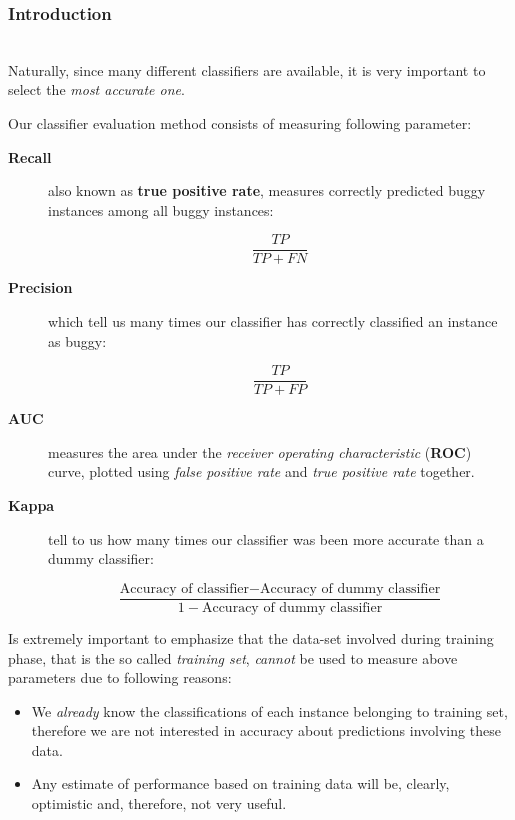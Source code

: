 \documentclass[sigconf]{acmart}
\begin{document}
\subsubsection{Introduction}
\hfill\\
Naturally, since many different classifiers are available, it is very important to select the \textit{most accurate one}. 

Our classifier evaluation method consists of measuring following parameter:

\begin{description}

\item[\textbf{Recall}] also known as \textbf{true positive rate}, measures correctly predicted buggy instances among all buggy instances:

\begin{equation}
\dfrac{TP}{TP + FN}
\end{equation}

\item[\textbf{Precision}] which tell us many times our classifier has correctly classified an instance as buggy:

\begin{equation}
\dfrac{TP}{TP + FP}
\end{equation}

\item[\textbf{AUC}] measures the area under the \textit{receiver operating characteristic} (\textbf{ROC}) curve, plotted using \textit{false positive rate} and \textit{true positive rate} together.

\item[\textbf{Kappa}] tell to us how many times our classifier was been more accurate than a dummy classifier:

\begin{equation}
\dfrac{\text{Accuracy of classifier} - \text{Accuracy of dummy classifier}}{1 - \text{Accuracy of dummy classifier}}
\end{equation}

\end{description}

Is extremely important to emphasize that the data-set involved during training phase, that is the so called \textit{training set}, \textit{cannot} be used to measure above parameters due to following reasons:
\begin{itemize}

\item We \textit{already} know the classifications of each instance belonging to training set, therefore we are not interested in accuracy about predictions involving these data.

\item Any estimate of performance based on training data will be, clearly, optimistic and, therefore, not very useful.
\end{itemize}
\end{document}
